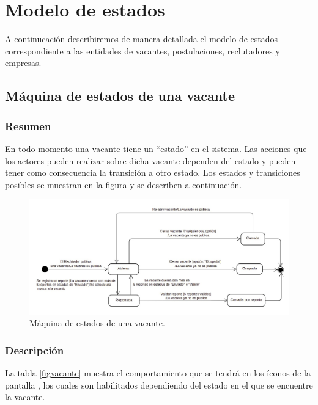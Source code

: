 \chapter{Modelo de estados}
A continucación describiremos de manera detallada el modelo de estados correspondiente a las entidades de vacantes, postulaciones, reclutadores
y empresas.
\section{Máquina de estados de una vacante}
\subsection{Resumen}
En todo momento una vacante tiene un ``estado'' en el sistema. Las acciones que
los actores pueden realizar sobre dicha vacante dependen del estado y pueden tener como
consecuencia la transición a otro estado.
Los estados y transiciones posibles se muestran en la
figura  y se describen a continuación.
\begin{figure}[hbtp!]
    \begin{center}
        \includegraphics[width=.6\textwidth]{anexos/imagenes/mvacante.jpeg}
    \end{center}
    \caption{Máquina de estados de una vacante.}
    \label{fig:arquitectura}
\end{figure}


\subsection{Descripción}

La tabla \ref{figvacante} muestra el comportamiento que se tendrá en los íconos de la pantalla 
, los cuales son habilitados dependiendo del estado en el que se encuentre  la vacante.


